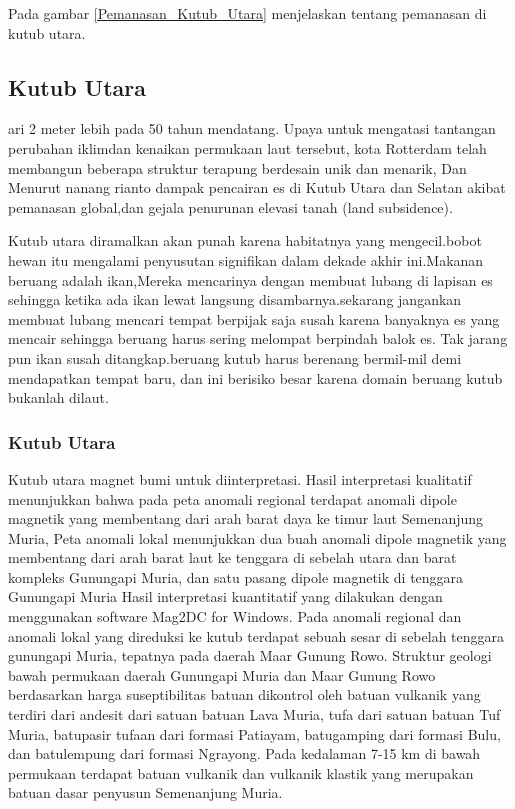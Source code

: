 Pada gambar \ref{Pemanasan_Kutub_Utara} menjelaskan tentang pemanasan di kutub utara.

\subsection	{Kutub Utara}	ari 2 meter lebih pada 50 tahun 
	mendatang. Upaya untuk mengatasi tantangan perubahan iklimdan kenaikan permukaan laut tersebut, kota Rotterdam telah membangun beberapa struktur terapung 
	berdesain unik dan menarik, Dan Menurut nanang rianto dampak pencairan es di Kutub Utara dan Selatan akibat pemanasan global,dan gejala penurunan elevasi
	tanah (land subsidence).
	
		Kutub utara diramalkan akan punah karena habitatnya yang mengecil.bobot hewan itu mengalami penyusutan signifikan dalam dekade
	akhir ini.Makanan beruang adalah ikan,Mereka mencarinya dengan membuat lubang di lapisan es sehingga ketika ada ikan lewat langsung disambarnya.sekarang 
	jangankan membuat lubang mencari tempat berpijak saja susah karena banyaknya es yang mencair sehingga beruang harus sering melompat berpindah balok es.
	Tak jarang pun ikan susah ditangkap.beruang kutub harus berenang bermil-mil demi mendapatkan tempat baru, dan ini berisiko besar karena domain beruang
	kutub bukanlah dilaut.
	
	
\subsubsection {Kutub Utara}
		Kutub utara magnet bumi untuk diinterpretasi. Hasil interpretasi kualitatif menunjukkan bahwa pada peta anomali regional terdapat anomali dipole magnetik
	yang membentang dari arah barat daya ke timur laut Semenanjung Muria, Peta anomali lokal menunjukkan dua buah anomali dipole magnetik yang membentang dari 
	arah barat laut ke tenggara di sebelah utara dan barat kompleks Gunungapi Muria, dan satu pasang dipole magnetik di tenggara Gunungapi Muria Hasil 
	interpretasi kuantitatif yang dilakukan dengan menggunakan software Mag2DC for Windows. Pada anomali regional dan anomali lokal yang direduksi ke kutub 
	terdapat sebuah sesar di sebelah tenggara gunungapi Muria, tepatnya pada daerah Maar Gunung Rowo. Struktur geologi bawah permukaan daerah Gunungapi Muria 
	dan Maar Gunung Rowo berdasarkan harga suseptibilitas batuan dikontrol oleh batuan vulkanik yang terdiri dari andesit dari satuan batuan Lava Muria, tufa 
	dari satuan batuan Tuf Muria, batupasir tufaan dari formasi Patiayam, batugamping dari formasi Bulu, dan batulempung dari formasi Ngrayong. Pada kedalaman
	7-15 km di bawah permukaan terdapat batuan vulkanik dan vulkanik klastik yang merupakan batuan dasar penyusun Semenanjung Muria.
	
